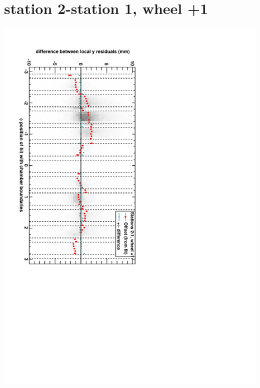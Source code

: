 \documentclass[compress]{beamer}
\begin{document}
\section*{station 2-station 1, wheel +1}
\begin{frame} \vfill \mbox{\hspace{-1 cm}\includegraphics[height=1.2\linewidth, angle=90]{DTzdiff12VsPhi_whD_slope.pdf}} \end{frame}
\end{document}
